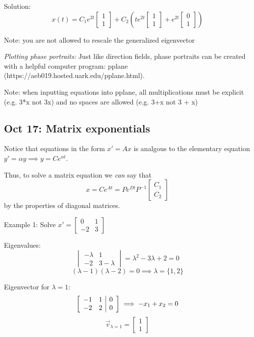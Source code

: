 \documentclass[12pt]{article}
\begin{document}
Solution:
\[\boxed{x(t) = C_1 e^{2t} \begin{bmatrix}
    1\\1
\end{bmatrix} + C_2\left(te^{2t} \begin{bmatrix}
    1\\1
\end{bmatrix} + e^{2t} \begin{bmatrix}
    0\\1
\end{bmatrix}\right)}\]

Note: you are not allowed to rescale the generalized eigenvector

\emph{Plotting phase portraits:} Just like direction fields, phase portraits can be created with a helpful computer program: pplane (https://aeb019.hosted.uark.edu/pplane.html).

Note: when inputting equations into pplane, all multiplications must be explicit (e.g. 3*x not 3x) and no spaces are allowed (e.g. 3+x not 3 + x)

\subsection*{Oct 17: Matrix exponentials}
Notice that equations in the form $x' = Ax$ is analgous to the elementary equation $y' = \alpha y \implies y = Ce^{\alpha t}$. 

Thus, to solve a matrix equation we \emph{can} say that 
\[x = Ce^{At} = Pe^{Dt}P^{-1} \begin{bmatrix}
    C_1\\
    C_2
\end{bmatrix}\]
by the properties of diagonal matrices. 

Example 1: Solve $x' = \begin{bmatrix}
    0 & 1\\
    -2 & 3
\end{bmatrix}$

Eigenvalues:
\[\begin{vmatrix}
    -\lambda & 1\\
    -2 & 3 - \lambda
\end{vmatrix} = \lambda^2 - 3\lambda + 2 = 0\]
\[(\lambda - 1)(\lambda - 2) = 0 \implies \lambda = \{1, 2\}\]

Eigenvector for $\lambda = 1$:
\[\left[\begin{array}{c c |c}
    -1 & 1 & 0\\
    -2 & 2 & 0
\end{array}\right] \implies -x_1 + x_2 = 0\]
\[\vec{v}_{\lambda = 1} = \begin{bmatrix}
    1\\
    1
\end{bmatrix}\]
\end{document}
